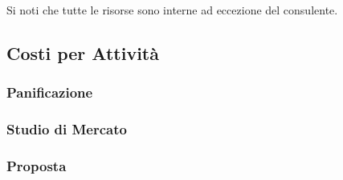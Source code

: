 Si noti che tutte le risorse sono interne ad eccezione del consulente. 


\subsection{Costi per Attività}

	

\subsubsection{Panificazione}



\subsubsection{Studio di Mercato}


\subsubsection{Proposta}





